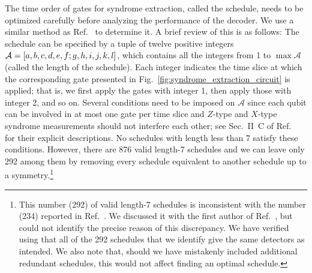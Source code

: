 \documentclass[a4paper,twocolumn,11pt,accepted=2025-01-21]{quantumarticle}
\theoremstyle{definition}
\theoremstyle{definition}
\theoremstyle{definition}
\begin{document}
The time order of \cnot gates for syndrome extraction, called the \cnot schedule, needs to be optimized carefully before analyzing the performance of the decoder.
We use a similar method as Ref.~\cite{beverland2021cost} to determine it.
A brief review of this is as follows:
The \cnot schedule can be specified by a tuple of twelve positive integers $\mathcal{A} = \qty[a, b, c, d, e, f; g, h, i, j, k, l]$, which contains all the integers from 1 to $\max\mathcal{A}$ (called the length of the schedule).
Each integer indicates the time slice at which the corresponding \cnot gate presented in Fig.~\ref{fig:syndrome_extraction_circuit} is applied; that is, we first apply the \cnot gates with integer 1, then apply those with integer 2, and so on.
Several conditions need to be imposed on $\mathcal{A}$ since each qubit can be involved in at most one \cnot gate per time slice and $Z$-type and $X$-type syndrome measurements should not interfere each other; see Sec.~II~C of Ref.~\cite{beverland2021cost} for their explicit descriptions.
No \cnot schedules with length less than 7 satisfy these conditions.
However, there are 876 valid length-7 schedules and we can leave only 292 among them by removing every schedule equivalent to another schedule up to a symmetry.\footnote{This number (292) of valid length-7 schedules is inconsistent with the number (234) reported in Ref.~\cite{beverland2021cost}. 
We discussed it with the first author of Ref.~\cite{beverland2021cost}, but could not identify the precise reason of this discrepancy.
We have verified using \stim that all of the 292 schedules that we identify give the same detectors as intended.  We also note that, should we have mistakenly included additional redundant schedules, this would not affect finding an optimal schedule.}
\end{document}
